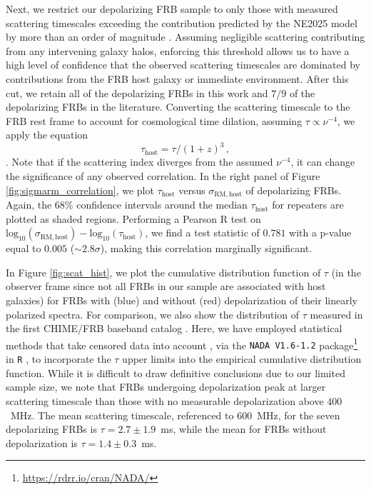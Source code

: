 \documentclass[twocolumn, linenumbers]{aastex701}
\begin{document}
Next, we restrict our depolarizing FRB sample to only those with measured scattering timescales exceeding the contribution predicted by the NE2025 model \citep[scaled to the same reference frequency assuming a frequency dependence of $\nu^{-4}$;][]{2026arXiv260211838O} by more than an order of magnitude \citep{2019MNRAS.486.3636P, 2022ApJ...927...59L, 2023MNRAS.519..821O, 2025ApJ...992..206C, 2025PASA...42..133S}. Assuming negligible scattering contributing from any intervening galaxy halos, enforcing this threshold allows us to have a high level of confidence that the observed scattering timescales are dominated by contributions from the FRB host galaxy or immediate environment. After this cut, we retain all of the depolarizing FRBs in this work and $7/9$ of the depolarizing FRBs in the literature. Converting the scattering timescale to the FRB rest frame to account for cosmological time dilation, assuming $\tau \propto \nu^{-4}$, we apply the equation
\begin{equation}
\tau_\mathrm{host} = \tau/(1+z)^3\,, \label{eq:tau_host}
\end{equation}
\citep{Macquart_2013_ApJ}. Note that if the scattering index diverges from the assumed $\nu^{-4}$, it can change the significance of any observed correlation. In the right panel of Figure \ref{fig:sigmarm_correlation}, we plot $\tau_\mathrm{host}$ versus $\sigma_\mathrm{RM,host}$ of depolarizing FRBs. Again, the 68\% confidence intervals around the median $\tau_\mathrm{host}$ for repeaters are plotted as shaded regions. Performing a Pearson R test on $\mathrm{log}_{10}(\sigma_\mathrm{RM,host})-\mathrm{log}_{10}(\tau_\mathrm{host})$, we find a test statistic of $0.781$ with a p-value equal to $0.005$ ($\sim 2.8 \sigma$), making this correlation marginally significant.

In Figure \ref{fig:scat_hist}, we plot the cumulative distribution function of $\tau$ (in the observer frame since not all FRBs in our sample are associated with host galaxies) for FRBs with (blue) and without (red) depolarization of their linearly polarized spectra. For comparison, we also show the distribution of $\tau$ measured in the first CHIME/FRB baseband catalog \citep{2025ApJ...979..160S}. Here, we have employed statistical methods that take censored data into account \citep[see, e.g.,][]{2012msma.book.....F}, via the {\tt NADA V1.6-1.2} package\footnote{\url{https://rdrr.io/cran/NADA/}} in {\tt R} \citep{helsel2005nondetects, NADApackage, Rsoftware}, to incorporate the $\tau$ upper limits into the empirical cumulative distribution function. While it is difficult to draw definitive conclusions due to our limited sample size, we note that FRBs undergoing depolarization peak at larger scattering timescale than those with no measurable depolarization above $400$~MHz. The mean scattering timescale, referenced to $600$~MHz, for the seven depolarizing FRBs is $\tau = 2.7\pm1.9$~ms, while the mean for FRBs without depolarization is $\tau = 1.4\pm0.3$~ms.
\end{document}
